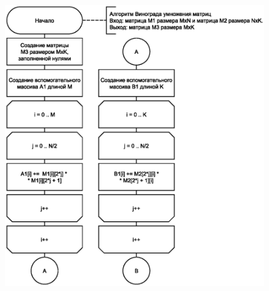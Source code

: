 \clearpage

\begin{figure}[h]
	\centering
	\includegraphics[scale=1]{img/vinograd-1-opt.eps}
	\label{fig:vinograd_opt-1}
\end{figure}
